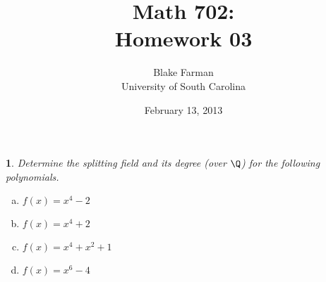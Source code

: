 \documentclass[10pt]{amsart}
\author{Blake Farman\\University of South Carolina}
\title{Math 702:\\Homework 03}
\date{February 13, 2013}
\begin{document}
\maketitle

\providecommand{\p}{\mathfrak{p}}
\providecommand{\m}{\mathfrak{m}}

\newtheorem{thm}{}
\newtheorem{lem}{Lemma}

\newcommand{\End}[2]{\operatorname{End}_{#1}\left(#2\right)}
\newcommand{\Hom}[2]{\operatorname{Hom}_{#1}\left(#2\right)}

\begin{thm}
  Determine the splitting field and its degree (over $\Q$) for the following polynomials.
  \begin{enumerate}[(a)]
  \item
    $f(x) = x^4 - 2$
  \item
    $f(x) = x^4 + 2$
  \item
    $f(x) = x^4 + x^2 + 1$
  \item
    $f(x) = x^6 - 4$
  \end{enumerate}
  

\end{thm}
\end{document}
